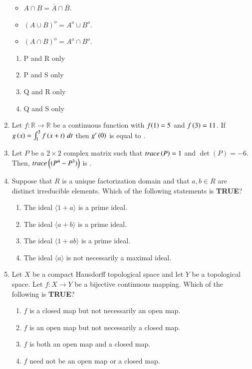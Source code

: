 \documentclass[journal]{IEEEtran}
\begin{document}
\begin{enumerate}
\begin{itemize}
    \item \( A \cap B = \overline{A} \cap \overline{B} \).
    \item \( (A \cup B)^o = A^o \cup B^o \).
    \item \( (A \cap B)^o = A^o \cap B^o \).
\end{itemize}
\begin{multicols}{4}
\begin{enumerate}
    \item P and R only
    \item P and S only
    \item Q and R only
    \item Q and S only
\end{enumerate}
\end{multicols}
\item Let $ f : \mathbb{R} \to \mathbb{R} $ be a continuous function with $ f{\left(1\right)} = 5 $ and $ f\left(3\right) = 11 $. If $ g\left(x\right) = \int_1^3 f\left(x + t\right) \, dt $ then $ g^{\prime}\left(0\right) $ is equal to \underline{\hspace{2cm}}.

\item  Let  $P$  be a $ 2 \times 2 $ complex matrix such that $ trace\left(P\right) = 1 $ and $ \det(P) = -6 $. Then, $ trace\left((P^{4} - P^{3})\right) $ is \underline{\hspace{2cm}}.

\item  Suppose that  $R$  is a unique factorization domain and that $ a, b \in R $ are distinct irreducible elements. Which of the following statements is \textbf{TRUE}?
\begin{enumerate}
    \item The ideal \( \langle 1 + a \rangle \) is a prime ideal.
    \item The ideal \( \langle a + b \rangle \) is a prime ideal.
    \item The ideal \( \langle 1 + ab \rangle \) is a prime ideal.
    \item The ideal \( \langle a \rangle \) is not necessarily a maximal ideal.
\end{enumerate}

\item  Let  $X$  be a compact Hausdorff topological space and let  $Y$  be a topological space. Let $ f : X \to Y $ be a bijective continuous mapping. Which of the following is \textbf{TRUE}?
\begin{enumerate}
    \item $f$ is a closed map but not necessarily an open map.
    \item $f$ is an open map but not necessarily a closed map.
    \item $f$ is both an open map and a closed map.
    \item $f$ need not be an open map or a closed map.
\end{enumerate}


\end{enumerate}
\end{document}
